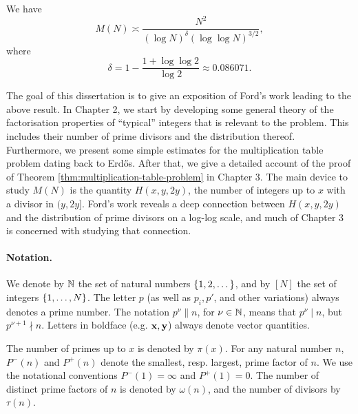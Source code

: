 \begin{theorem} \label{thm:multiplication-table-problem}
    We have
    \begin{equation*}
        M(N) \asymp \frac{N^2}{(\log N)^\delta (\log \log N)^{3/2}},
    \end{equation*}
    where 
    \begin{equation*}
        \delta = 1 - \frac{1 + \log \log 2}{\log 2} \approx 0.086071.
    \end{equation*}
\end{theorem}

The goal of this dissertation is to give an exposition of Ford's work leading to the above result. 
In Chapter 2, we start by developing some general theory of the factorisation properties of ``typical'' integers that is relevant to the problem. 
This includes their number of prime divisors and the distribution thereof. 
Furthermore, we present some simple estimates for the multiplication table problem dating back to Erd\H{o}s.
After that, we give a detailed account of the proof of Theorem \ref{thm:multiplication-table-problem} in Chapter 3.
The main device to study $M(N)$ is the quantity $H(x, y, 2y)$, the number of integers up to $x$ with a divisor in $(y, 2y]$.
Ford's work reveals a deep connection between $H(x, y, 2y)$ and the distribution of prime divisors on a log-log scale, and much of Chapter 3 is concerned with studying that connection.

\paragraph{Notation.}
We denote by $\mathbb{N}$ the set of natural numbers $\left\{1, 2, \dots\right\}$, and by $[N]$ the set of integers $\left\{1, \dots, N\right\}$.
The letter $p$ (as well as $p_i, p'$, and other variations) always denotes a prime number. 
The notation $p^\nu\parallel n$, for $\nu \in \mathbb{N}$, means that $p^\nu \mid n$, but $p^{\nu + 1} \nmid n$. 
Letters in boldface (e.g. $\mathbf{x}, \mathbf{y}$) always denote vector quantities.

The number of primes up to $x$ is denoted by $\pi(x)$.
For any natural number $n$, $P^-(n)$ and $P^+(n)$ denote the smallest, resp. largest, prime factor of $n$. 
We use the notational conventions $P^-(1) = \infty$ and $P^+(1) = 0$.
The number of distinct prime factors of $n$ is denoted by $\omega(n)$, and the number of divisors by $\tau(n)$. 

